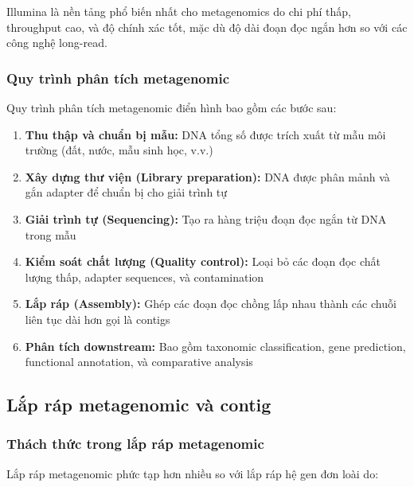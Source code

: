 Illumina là nền tảng phổ biến nhất cho metagenomics do chi phí thấp, throughput cao, và độ chính xác tốt, mặc dù độ dài đoạn đọc ngắn hơn so với các công nghệ long-read.

\subsubsection{Quy trình phân tích metagenomic}

Quy trình phân tích metagenomic điển hình bao gồm các bước sau:

\begin{enumerate}
    \item \textbf{Thu thập và chuẩn bị mẫu:} DNA tổng số được trích xuất từ mẫu môi trường (đất, nước, mẫu sinh học, v.v.)

    \item \textbf{Xây dựng thư viện (Library preparation):} DNA được phân mảnh và gắn adapter để chuẩn bị cho giải trình tự

    \item \textbf{Giải trình tự (Sequencing):} Tạo ra hàng triệu đoạn đọc ngắn từ DNA trong mẫu

    \item \textbf{Kiểm soát chất lượng (Quality control):} Loại bỏ các đoạn đọc chất lượng thấp, adapter sequences, và contamination

    \item \textbf{Lắp ráp (Assembly):} Ghép các đoạn đọc chồng lấp nhau thành các chuỗi liên tục dài hơn gọi là contigs

    \item \textbf{Phân tích downstream:} Bao gồm taxonomic classification, gene prediction, functional annotation, và comparative analysis
\end{enumerate}

\subsection{Lắp ráp metagenomic và contig}

\subsubsection{Thách thức trong lắp ráp metagenomic}

Lắp ráp metagenomic phức tạp hơn nhiều so với lắp ráp hệ gen đơn loài do:

